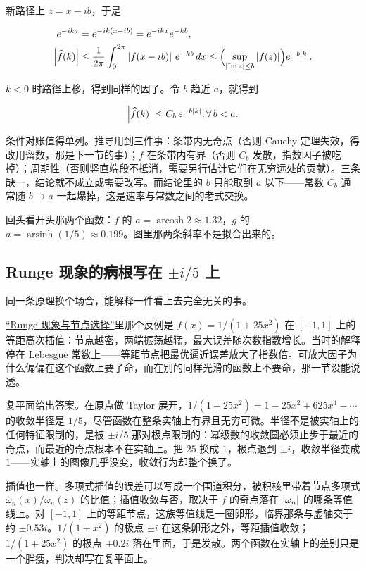 新路径上 \(z=x-ib\)，于是

\[
\begin{aligned}
e^{-ikz}&=e^{-ik(x-ib)}=e^{-ikx}e^{-kb},\\
\left|\widehat{f}(k)\right|&\le\frac1{2\pi}\int_0^{2\pi}\left|f(x-ib)\right|\,e^{-kb}\,dx
\le\Bigl(\sup_{\left|\operatorname{Im}z\right|\le b}\left|f(z)\right|\Bigr)e^{-b\left|k\right|}.
\end{aligned}
\]

\(k<0\) 时路径上移，得到同样的因子。令 \(b\) 趋近 \(a\)，就得到

\[
\left|\widehat{f}(k)\right|\le C_b\,e^{-b\left|k\right|},\space \forall\,b<a.
\]

条件对账值得单列。推导用到三件事：条带内无奇点（否则 Cauchy 定理失效，得改用留数，那是下一节的事）；\(f\) 在条带内有界（否则 \(C_b\) 发散，指数因子被吃掉）；周期性（否则竖直端段不抵消，需要另行估计它们在无穷远处的贡献）。三条缺一，结论就不成立或需要改写。而结论里的 \(b\) 只能取到 \(a\) 以下——常数 \(C_b\) 通常随 \(b\to a\) 一起爆掉，这是速率与常数之间的老式交换。

回头看开头那两个函数：\(f\) 的 \(a=\operatorname{arcosh}2\approx1.32\)，\(g\) 的 \(a=\operatorname{arsinh}(1/5)\approx0.199\)。图里那两条斜率不是拟合出来的。

\subsection{Runge 现象的病根写在 \(\pm i/5\) 上}

同一条原理换个场合，能解释一件看上去完全无关的事。

\hyperref[sec:08-Numerical-Analysis/03-Interpolation-and-Approximation/02]{``Runge 现象与节点选择''}里那个反例是 \(f(x)=1/(1+25x^2)\) 在 \([-1,1]\) 上的等距高次插值：节点越密，两端振荡越猛，最大误差随次数指数增长。当时的解释停在 Lebesgue 常数上——等距节点把最优逼近误差放大了指数倍。可放大因子为什么偏偏在这个函数上要了命，而在别的同样光滑的函数上不要命，那一节没能说透。

复平面给出答案。在原点做 Taylor 展开，\(1/(1+25x^2)=1-25x^2+625x^4-\cdots\) 的收敛半径是 \(1/5\)，尽管函数在整条实轴上有界且无穷可微。半径不是被实轴上的任何特征限制的，是被 \(\pm i/5\) 那对极点限制的：幂级数的收敛圆必须止步于最近的奇点，而最近的奇点根本不在实轴上。把 \(25\) 换成 \(1\)，极点退到 \(\pm i\)，收敛半径变成 \(1\)——实轴上的图像几乎没变，收敛行为却整个换了。

插值也一样。多项式插值的误差可以写成一个围道积分，被积核里带着节点多项式 \(\omega_n(x)/\omega_n(z)\) 的比值；插值收敛与否，取决于 \(f\) 的奇点落在 \(\left|\omega_n\right|\) 的哪条等值线上。对 \([-1,1]\) 上的等距节点，这族等值线是一圈卵形，临界那条与虚轴交于约 \(\pm0.53i\)。\(1/(1+x^2)\) 的极点 \(\pm i\) 在这条卵形之外，等距插值收敛；\(1/(1+25x^2)\) 的极点 \(\pm 0.2i\) 落在里面，于是发散。两个函数在实轴上的差别只是一个胖瘦，判决却写在复平面上。

